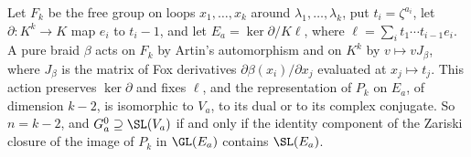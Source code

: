 \begin{lemma}\label{lem:foxmodel}
Let $F_{k}$ be the free group on loops $x_{1},\dots,x_{k}$ around
$\lambda_{1},\dots,\lambda_{k}$, put $t_{i}=\zeta^{a_{i}}$, let
$\partial\colon K^{k}\to K$ map $e_{i}$ to $t_{i}-1$, and let
$E_{a}=\ker\partial/K\ell$, where $\ell=\sum_{i}t_{1}\cdots t_{i-1}e_{i}$. A pure
braid $\beta$ acts on $F_{k}$ by Artin's automorphism and on $K^{k}$ by
$v\mapsto vJ_{\beta}$, where $J_{\beta}$ is the matrix of Fox derivatives
$\partial\beta(x_{i})/\partial x_{j}$ evaluated at $x_{j}\mapsto t_{j}$. This
action preserves $\ker\partial$ and fixes $\ell$, and the representation of
$P_{k}$ on $E_{a}$, of dimension $k-2$, is isomorphic to $V_{a}$, to its dual
or to its complex conjugate. So $n=k-2$, and $G_{a}^{0}\supseteq\SL(V_{a})$ if
and only if the identity component of the Zariski closure of the image of
$P_{k}$ in $\GL(E_{a})$ contains $\SL(E_{a})$.
\end{lemma}

